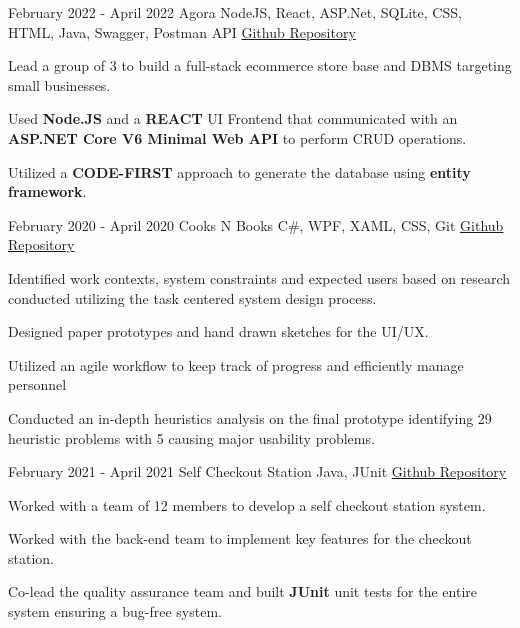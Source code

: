 \documentclass[]{awesome-cv}
\begin{document}
\vspace{-11mm}
\vspace{-4mm}
\begin{cventries}
	  \cventry
	{February 2022 - April 2022}
    {Agora}
	{NodeJS, React, ASP.Net, SQLite, CSS, HTML, Java, Swagger, Postman API}
	{\href{https://github.com/krang-8/Agora}{Github Repository}}
    {
      \begin{cvitems} %
        \item {Lead a group of 3 to build a full-stack ecommerce store base and DBMS targeting small businesses.}
        \item {Used \textbf{Node.JS} and a \textbf{REACT }UI Frontend that communicated with an \textbf{ASP.NET Core V6 Minimal Web API} to perform CRUD operations.}
        \item {Utilized a \textbf{CODE-FIRST} approach to generate the database using \textbf{entity framework}.}
      \end{cvitems}
    }
    	\vspace{1mm}
    \vspace{-2mm}

		  \cventry
	{February 2020 - April 2020}
	{Cooks N Books}
	{C\#, WPF, XAML, CSS, Git }
	{\href{https://github.com/krang-8/cooksNbooks}{Github Repository}}
    {
      \begin{cvitems} %
        \item {Identified work contexts, system constraints and expected users based on research conducted utilizing the task centered system design process.}
        \item {Designed paper prototypes and hand drawn sketches for the UI/UX.}
        \item {Utilized an agile workflow to keep track of progress and efficiently manage personnel}
        \item { Conducted an in-depth heuristics analysis on the final prototype identifying 29 heuristic problems with 5 
causing major usability problems.}
      \end{cvitems}
    }
        	\vspace{1mm}
	  \cventry
	{February 2021 - April 2021}
    {Self Checkout Station}
	{Java, JUnit}
	{\href{https://github.com/krang-8/SENG-300-Iteration-3}{Github Repository}}
    {
      \begin{cvitems} %
        \item {Worked with a team of 12 members to develop a self checkout station system.}
        \item {Worked with the back-end team to implement key features for the checkout station.}
        \item {Co-lead the quality assurance team and built \textbf{JUnit} unit tests for the entire system ensuring a bug-free system.}
      \end{cvitems}
    }
    	\vspace{1mm}


\end{cventries}
\end{document}
